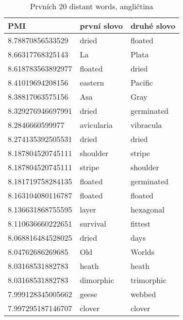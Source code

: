\documentclass[12pt, a4paper]{report}
\theoremstyle{remark}
\begin{document}
\begin{table}[h!]
\begin{tabular}{lll}
         PMI & první slovo & druhé slovo \\
\toprule
8.78870856533529 & dried & floated \\
8.66317768325143 & La & Plata \\
8.618783563892977 & floated & dried \\
8.41019694208156 & eastern & Pacific \\
8.38817063575156 & Asa & Gray \\
8.329276946697991 & dried & germinated \\
8.2846660599977 & avicularia & vibracula \\
8.274135392505531 & dried & dried \\
8.187804520745111 & shoulder & stripe \\
8.187804520745111 & stripe & shoulder \\
8.181719758284135 & floated & germinated \\
8.163104080116787 & floated & floated \\
8.136631868755595 & layer & hexagonal \\
8.110636660222651 & survival & fittest \\
8.068816484528025 & dried & days \\
8.04762686269685 & Old & Worlds \\
8.03168531882783 & heath & heath \\
8.03168531882783 & dimorphic & trimorphic \\
7.999128345005662 & geese & webbed \\
7.997295187146707 & clover & clover \\
\end{tabular}
\caption{Prvních 20 distant words, angličtina}
\end{table}
\end{document}
